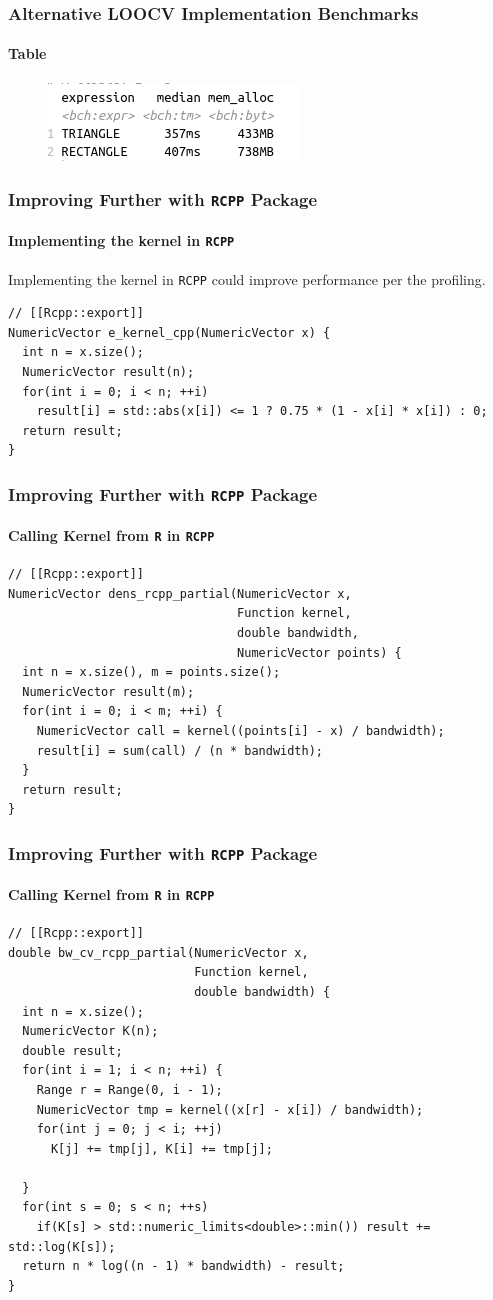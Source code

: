 \documentclass[aspectratio=169]{beamer}
\begin{document}
\begin{frame}
  \frametitle{Alternative LOOCV Implementation Benchmarks}
  \framesubtitle{Table}
  \begin{figure}
    \centering
    \includegraphics[scale = 0.7]{figure/TRIANGLE_RECTANGLE.png}
  \end{figure}
\end{frame}
\begin{frame}[fragile]
  \frametitle{Improving Further with \texttt{RCPP} Package} 
  \framesubtitle{Implementing the kernel in \texttt{RCPP}}
  Implementing the kernel in \texttt{RCPP} could improve performance per the profiling.\\
\begin{verbatim}
// [[Rcpp::export]]
NumericVector e_kernel_cpp(NumericVector x) {
  int n = x.size();
  NumericVector result(n);
  for(int i = 0; i < n; ++i)
    result[i] = std::abs(x[i]) <= 1 ? 0.75 * (1 - x[i] * x[i]) : 0;
  return result;
}
\end{verbatim}
\end{frame}
\begin{frame}[fragile]
  \frametitle{Improving Further with \texttt{RCPP} Package}
  \framesubtitle{Calling Kernel from \texttt{R} in \texttt{RCPP}} 
\begin{verbatim}
// [[Rcpp::export]]
NumericVector dens_rcpp_partial(NumericVector x,
                                Function kernel,
                                double bandwidth,
                                NumericVector points) {
  int n = x.size(), m = points.size();
  NumericVector result(m);
  for(int i = 0; i < m; ++i) {
    NumericVector call = kernel((points[i] - x) / bandwidth);
    result[i] = sum(call) / (n * bandwidth);
  }
  return result;
}
\end{verbatim}
\end{frame}
\begin{frame}[fragile]
  \frametitle{Improving Further with \texttt{RCPP} Package}
  \framesubtitle{Calling Kernel from \texttt{R} in \texttt{RCPP}}
\begin{verbatim}
// [[Rcpp::export]]
double bw_cv_rcpp_partial(NumericVector x,
                          Function kernel,
                          double bandwidth) {
  int n = x.size();
  NumericVector K(n);
  double result;
  for(int i = 1; i < n; ++i) {
    Range r = Range(0, i - 1);
    NumericVector tmp = kernel((x[r] - x[i]) / bandwidth);
    for(int j = 0; j < i; ++j)
      K[j] += tmp[j], K[i] += tmp[j];
      
  }
  for(int s = 0; s < n; ++s)
    if(K[s] > std::numeric_limits<double>::min()) result += std::log(K[s]);
  return n * log((n - 1) * bandwidth) - result;
}
\end{verbatim} 
\end{frame}
\end{document}
